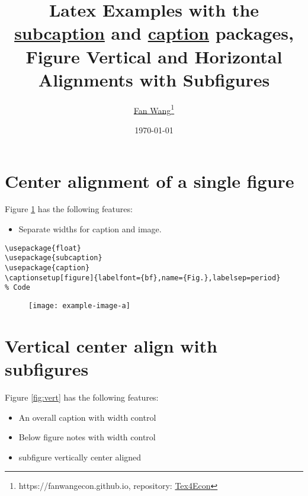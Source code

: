 \documentclass[12pt,english]{article}
\title{Latex Examples with the \href{https://ctan.org/pkg/subcaption?lang=en}{subcaption} and \href{https://ctan.org/pkg/caption?lang=en}{caption} packages, Figure Vertical and Horizontal Alignments with Subfigures}
\author{\href{https://fanwangecon.github.io/}{Fan Wang}\thanks{https://fanwangecon.github.io, repository: \href{https://fanwangecon.github.io/Tex4Econ/}{Tex4Econ}}}
\date{\today}
\begin{document}
\maketitle
\tableofcontents
\clearpage 

\section{Center alignment of a single figure}

Figure \ref{fig:single} has the following features:
\begin{itemize}
    \item Separate widths for caption and image.
\end{itemize}

\begin{lstlisting}[frame=single]
% Included Package
\usepackage{float}
\usepackage{subcaption}
\usepackage{caption}
\captionsetup[figure]{labelfont={bf},name={Fig.},labelsep=period}
% Code
\end{lstlisting}

\par\medskip
\begin{figure}[H]
    \centering
	\texttt{[image: example-image-a]}
	\captionsetup{width=0.6\textwidth}
	\caption{\blindtext}
	\label{fig:single}
\end{figure}
\pagebreak


\section{Vertical center align with subfigures}

Figure \ref{fig:vert} has the following features:
\begin{itemize}
    \item An overall caption with width control
    \item Below figure notes with width control
    \item subfigure vertically center aligned
\end{itemize}
\end{document}
